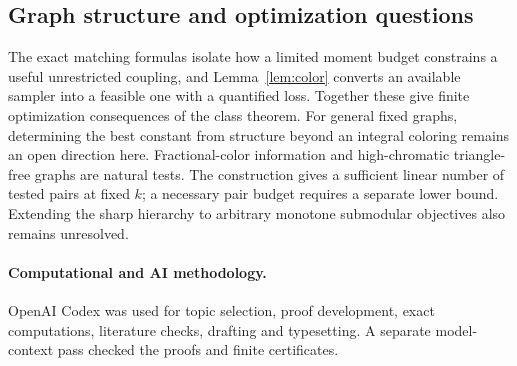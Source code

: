 \subsection{Graph structure and optimization questions}
The exact matching formulas isolate how a limited moment budget constrains
a useful unrestricted coupling, and Lemma~\ref{lem:color} converts an
available sampler into a feasible one with a quantified loss. Together
these give finite optimization consequences of the class theorem.
For general fixed graphs, determining the best constant from structure
beyond an integral coloring remains an open direction here. Fractional-color
information and high-chromatic triangle-free graphs are natural tests.
The construction gives a sufficient linear number of tested pairs at fixed
\(k\); a necessary pair budget requires a separate lower bound.
Extending the sharp hierarchy to arbitrary monotone submodular objectives
also remains unresolved.

\paragraph{Computational and AI methodology.}
OpenAI Codex was used for topic selection, proof development, exact
computations, literature checks, drafting and typesetting. A separate
model-context pass checked the proofs and finite certificates.
